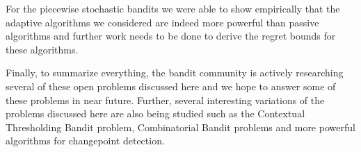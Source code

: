     For the piecewise stochastic bandits we were able to show empirically that the adaptive algorithms we considered are indeed more powerful than passive algorithms and further work needs to be done to derive the regret bounds for these algorithms. 
    
    Finally, to summarize everything, the bandit community is actively researching several of these open problems discussed here and we hope to answer some of these problems in near future. Further, several interesting variations of the problems discussed here are also being studied such as the Contextual Thresholding Bandit problem, Combinatorial Bandit problems \citep{cesa2012combinatorial} and more powerful algorithms for changepoint detection.


